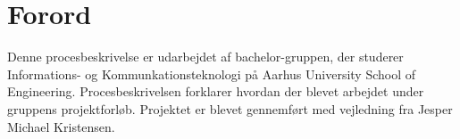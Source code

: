 \section{Forord}

Denne procesbeskrivelse er udarbejdet af bachelor-gruppen, der studerer Informations- og Kommunkationsteknologi på Aarhus University School of Engineering. Procesbeskrivelsen forklarer hvordan der blevet arbejdet under gruppens projektforløb. Projektet er blevet gennemført med vejledning fra Jesper Michael Kristensen.